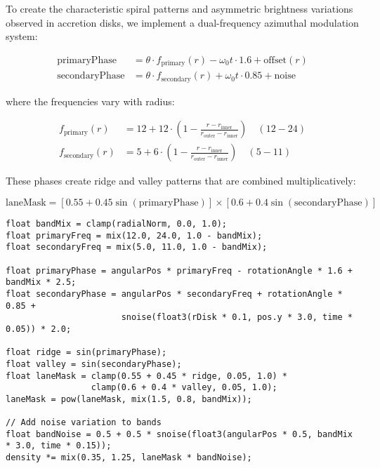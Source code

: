 \documentclass[12pt,a4paper]{article}
\theoremstyle{definition}
\theoremstyle{remark}
\begin{document}
To create the characteristic spiral patterns and asymmetric brightness variations observed in accretion disks, we implement a dual-frequency azimuthal modulation system:

\begin{align}
    \text{primaryPhase} &= \theta \cdot f_{\text{primary}}(r) - \omega_0 t \cdot 1.6 + \text{offset}(r) \\
    \text{secondaryPhase} &= \theta \cdot f_{\text{secondary}}(r) + \omega_0 t \cdot 0.85 + \text{noise}
\end{align}

where the frequencies vary with radius:

\begin{align}
    f_{\text{primary}}(r) &= 12 + 12 \cdot \left(1 - \frac{r - r_{\text{inner}}}{r_{\text{outer}} - r_{\text{inner}}}\right) \quad (12-24) \\
    f_{\text{secondary}}(r) &= 5 + 6 \cdot \left(1 - \frac{r - r_{\text{inner}}}{r_{\text{outer}} - r_{\text{inner}}}\right) \quad (5-11)
\end{align}

These phases create ridge and valley patterns that are combined multiplicatively:

\begin{equation}
    \text{laneMask} = \left[0.55 + 0.45 \sin(\text{primaryPhase})\right] \times \left[0.6 + 0.4 \sin(\text{secondaryPhase})\right]
\end{equation}

\begin{lstlisting}[style=metalstyle, caption=Azimuthal banding implementation]
float bandMix = clamp(radialNorm, 0.0, 1.0);
float primaryFreq = mix(12.0, 24.0, 1.0 - bandMix);
float secondaryFreq = mix(5.0, 11.0, 1.0 - bandMix);

float primaryPhase = angularPos * primaryFreq - rotationAngle * 1.6 + bandMix * 2.5;
float secondaryPhase = angularPos * secondaryFreq + rotationAngle * 0.85 + 
                       snoise(float3(rDisk * 0.1, pos.y * 3.0, time * 0.05)) * 2.0;

float ridge = sin(primaryPhase);
float valley = sin(secondaryPhase);
float laneMask = clamp(0.55 + 0.45 * ridge, 0.05, 1.0) * 
                 clamp(0.6 + 0.4 * valley, 0.05, 1.0);
laneMask = pow(laneMask, mix(1.5, 0.8, bandMix));

// Add noise variation to bands
float bandNoise = 0.5 + 0.5 * snoise(float3(angularPos * 0.5, bandMix * 3.0, time * 0.15));
density *= mix(0.35, 1.25, laneMask * bandNoise);
\end{lstlisting}
\end{document}
